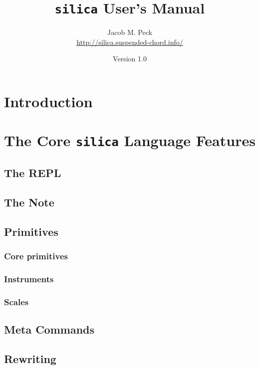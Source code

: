 \documentclass{book}
\begin{document}
\title{\texttt{silica} User's Manual}
\author{Jacob M. Peck\\\url{http://silica.suspended-chord.info/}}
\date{Version 1.0}
\maketitle \pagebreak

\tableofcontents
\pagebreak

\part{Introduction}

\part{The Core \texttt{silica} Language Features}

\chapter{The REPL}

\chapter{The Note}

\chapter{Primitives}
\section{Core primitives}

\section{Instruments}

\section{Scales}


\chapter{Meta Commands}

\chapter{Rewriting}
\end{document}
